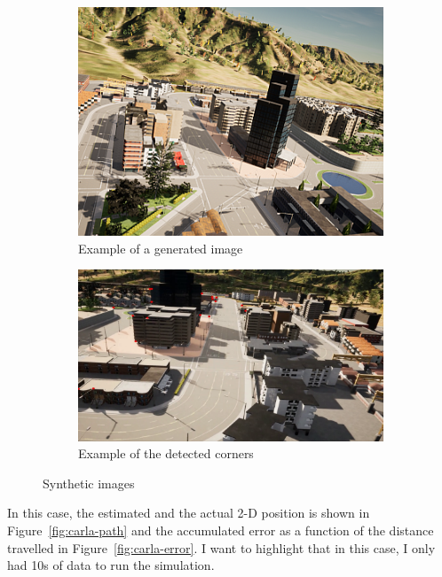 \begin{figure}[!ht]
    \centering
    \begin{subfigure}{0.45\textwidth}
        \includegraphics[width=\textwidth]{figures/carla-img-example.png}
        \caption{Example of a generated image}\label{fig:carla-1}
    \end{subfigure}
    \begin{subfigure}{0.45\textwidth}
        \includegraphics[width=\textwidth]{figures/carla-img-corner.png}
        \caption{Example of the detected corners}\label{fig:carla-2}
    \end{subfigure}
    \caption{Synthetic images}\label{fig:carla}
\end{figure}

In this case, the estimated and the actual 2-D position is shown in Figure~\ref{fig:carla-path} and the accumulated error as a function of the distance travelled in Figure~\ref{fig:carla-error}. I want to highlight that in this case, I only had 10\si{\second} of data to run the simulation.


